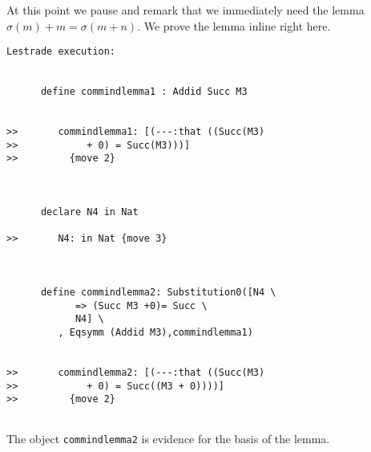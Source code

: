 \documentclass[12pt]{article}
\begin{document}
At this point we pause and remark that we immediately need the lemma $\sigma(m)+m = \sigma(m+n)$.  We prove the lemma inline right here.

\begin{verbatim}Lestrade execution:


      define commindlemma1 : Addid Succ M3


>>       commindlemma1: [(---:that ((Succ(M3)
>>            + 0) = Succ(M3)))]
>>         {move 2}



      declare N4 in Nat

>>       N4: in Nat {move 3}



      define commindlemma2: Substitution0([N4 \
            => (Succ M3 +0)= Succ \
            N4] \
         , Eqsymm (Addid M3),commindlemma1)


>>       commindlemma2: [(---:that ((Succ(M3)
>>            + 0) = Succ((M3 + 0))))]
>>         {move 2}


\end{verbatim}

The object {\tt commindlemma2} is evidence for the basis of the lemma.
\end{document}

